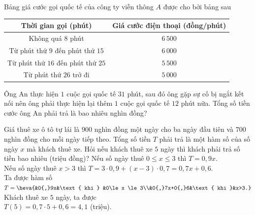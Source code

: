 \begin{bt}%
	Bảng giá cước gọi quốc tế của công ty viễn thông $A$ được cho bởi bảng sau
	\begin{center}
		\begin{tabular}{|c|c|}
			\hline
			Thời gian gọi (phút) & Giá cước điện thoại (đồng/phút)\\
			\hline
			Không quá $8$ phút & $6\,500$ \\
			\hline
			Từ phút thứ $9$ đến phút thứ $15$ & $6\,000$ \\
			\hline
			Từ phút thứ $16$ đến phút thứ $25$ & $5\,500$ \\
			\hline
			Từ phút thứ $26$ trở đi & $5\,000$\\
			\hline
		\end{tabular}
	\end{center}
	Ông An thực hiện $1$ cuộc gọi quốc tế $31$ phút, sau đó ông gặp sự cố bị ngắt kết nối nên ông phải thực hiện lại thêm $1$ cuộc gọi quốc tế $12$ phút nữa. Tổng số tiền cước ông An phải trả là bao nhiêu nghìn đồng?
\end{bt}

\begin{bt}%
	Giá thuê xe ô tô tự lái là $900$ nghìn đồng một ngày cho ba ngày đầu tiên và $700$ nghìn đồng cho mỗi ngày tiếp theo. Tổng số tiền $T$ phải trả là một hàm số của số ngày $x$ mà khách thuê xe. Hỏi nếu khách thuê xe $5$ ngày thì khách phải trả số tiền bao nhiêu (triệu đồng)?
	\loigiai
	{
		Nếu số ngày thuê $0\le x \le 3$ thì $T = 0{,}9x$.\\
		Nếu số ngày thuê $x > 3$ thì $T = 3 \cdot 0{,}9 + (x-3)\cdot 0{,}7 = 0{,}7x +  0{,}6$.\\
		Ta được hàm số $T = \heva{&0{,}9x&\text{ khi } &0\le x \le 3\\&0{,}7x+0{,}6&\text{ khi }&x>3.}$\\
		Khách thuê xe $5$ ngày, ta được\\
		$T(5) = 0{,}7 \cdot 5 + 0{,}6 = 4{,}1$ (triệu).
	}
\end{bt}

